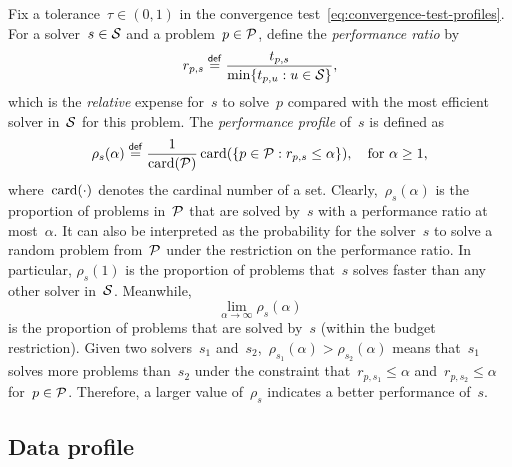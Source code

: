 Fix a tolerance~$\tau \in (0, 1)$ in the convergence test~\cref{eq:convergence-test-profiles}.
For a solver~$s \in \mathcal{S}$ and a problem~$p \in \mathcal{P}$, define the \emph{performance ratio} by
\begin{equation}
    \label{eq:performance-ratio}
    r_{p, s} \mathrel{\stackrel{\mathsf{def}}{=}} \frac{t_{p, s}}{\min \{t_{p, u} : u \in \mathcal{S}\}},
\end{equation}
which is the \emph{relative} expense for~$s$ to solve~$p$ compared with the most efficient solver in~$\mathcal{S}$ for this problem.
The \emph{performance profile} of~$s$ is defined as
\begin{equation*}
    \rho_s(\alpha) \mathrel{\stackrel{\mathsf{def}}{=}} \frac{1}{\operatorname{card}(\mathcal{P})} \operatorname{card} (\{p \in \mathcal{P} : r_{p, s} \le \alpha\}), \quad \text{for~$\alpha \ge 1$},
\end{equation*}
%
where~$\operatorname{card}(\cdot)$ denotes the cardinal number of a set.
Clearly,~$\rho_s(\alpha)$ is the proportion of problems in~$\mathcal{P}$ that are solved by~$s$ with a performance ratio at most~$\alpha$.
It can also be interpreted as the probability for the solver~$s$ to solve a random problem from~$\mathcal{P}$ under the restriction on the performance ratio.
In particular, $\rho_s(1)$ is the proportion of problems that~$s$ solves faster than any other solver in~$\mathcal{S}$.
Meanwhile,
\begin{equation*}
    \lim_{\alpha \to \infty} \rho_s(\alpha)
\end{equation*}
is the proportion of problems that are solved by~$s$ (within the budget restriction).
Given two solvers~$s_1$ and~$s_2$,~$\rho_{s_1}(\alpha) > \rho_{s_2}(\alpha)$ means that~$s_1$ solves more problems than~$s_2$ under the constraint that~$r_{p, s_1} \le \alpha$ and~$r_{p, s_2} \le \alpha$ for~$p \in \mathcal{P}$.
Therefore, a larger value of~$\rho_s$ indicates a better performance of~$s$.

\subsection{Data profile}

